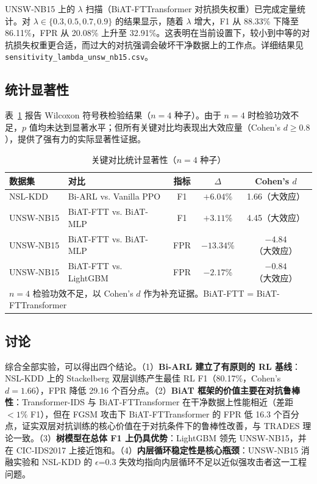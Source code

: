 \documentclass[12pt,a4paper]{ctexart}
\begin{document}
UNSW-NB15 上的 $\lambda$ 扫描（BiAT-FTTransformer 对抗损失权重）已完成定量统计。对 $\lambda \in \{0.3,0.5,0.7,0.9\}$ 的结果显示，随着 $\lambda$ 增大，F1 从 88.33\% 下降至 86.11\%，FPR 从 20.08\% 上升至 32.91\%。这表明在当前设置下，较小到中等的对抗损失权重更合适，而过大的对抗强调会破坏干净数据上的工作点。详细结果见 \texttt{sensitivity\_lambda\_unsw\_nb15.csv}。

\subsection{统计显著性}

表~\ref{tab:sig_cn} 报告 Wilcoxon 符号秩检验结果（$n=4$ 种子）。由于 $n=4$ 时检验功效不足，$p$ 值均未达到显著水平；但所有关键对比均表现出大效应量（Cohen's $d \geq 0.8$），提供了强有力的实际显著性证据。

\begin{table}[H]
\centering
\caption{关键对比统计显著性（$n=4$ 种子）}
\label{tab:sig_cn}
\begin{tabular}{llccc}
\toprule
\textbf{数据集} & \textbf{对比} & \textbf{指标} & \textbf{$\Delta$} & \textbf{Cohen's $d$} \\
\midrule
NSL-KDD   & Bi-ARL vs. Vanilla PPO & F1  & $+6.04$\% & 1.66（大效应） \\
UNSW-NB15 & BiAT-FTT vs. BiAT-MLP  & F1  & $+3.11$\% & 4.45（大效应） \\
UNSW-NB15 & BiAT-FTT vs. BiAT-MLP  & FPR & $-13.34$\% & $-4.84$（大效应） \\
UNSW-NB15 & BiAT-FTT vs. LightGBM  & FPR & $-2.17$\% & $-0.84$（大效应） \\
\bottomrule
\multicolumn{5}{l}{\scriptsize{$n{=}4$ 检验功效不足，以 Cohen's $d$ 作为补充证据。BiAT-FTT = BiAT-FTTransformer}}
\end{tabular}
\end{table}

\subsection{讨论}

综合全部实验，可以得出四个结论。（1）\textbf{Bi-ARL 建立了有原则的 RL 基线}：NSL-KDD 上的 Stackelberg 双层训练产生最佳 RL F1（80.17\%，Cohen's $d=1.66$），FPR 降低 29.16 个百分点。（2）\textbf{BiAT 框架的价值主要在对抗鲁棒性}：Transformer-IDS 与 BiAT-FTTransformer 在干净数据上性能相近（差距 $<1\%$ F1），但在 FGSM 攻击下 BiAT-FTTransformer 的 FPR 低 16.3 个百分点，证实双层对抗训练的核心价值在于对抗条件下的鲁棒性改善，与 TRADES 理论一致。（3）\textbf{树模型在总体 F1 上仍具优势}：LightGBM 领先 UNSW-NB15，并在 CIC-IDS2017 上接近饱和。（4）\textbf{内层循环稳定性是核心瓶颈}：UNSW-NB15 消融实验和 NSL-KDD 的 $\epsilon$=0.3 失效均指向内层循环不足以近似强攻击者这一工程问题。
\end{document}
